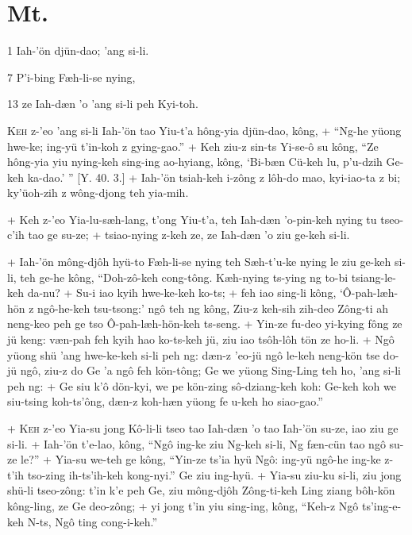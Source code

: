 \section{Mt.}%

\begin{sAbstract}
	\item[1] Iah-'ön djün-dao; 'ang si-li.
	\item[7] P'i-bing Fæh-li-se nying,
	\item[13] ze Iah-dæn 'o 'ang si-li peh Kyi-toh.
\end{sAbstract}

\header
\lettrine{K}{eh} z-'eo 'ang si-li Iah-'ön tao Yiu-t'a hông-yia djün-dao, kông,
+	``Ng-he yüong hwe-ke; ing-yü t'in-koh z gying-gao.''
+	Keh ziu-z sin-ts Yi-se-ô su kông, ``Ze hông-yia yiu nying-keh sing-ing ao-hyiang, kông, `Bi-bæn Cü-keh lu, p'u-dzih Ge-keh ka-dao.' '' [Y. 40. 3.]
+	Iah-'ön tsiah-keh i-zông z lôh-do mao, kyi-iao-ta z bi; ky'üoh-zih z wông-djong teh yia-mih.
\par
+	Keh z-'eo Yia-lu-sæh-lang, t'ong Yiu-t'a, teh Iah-dæn 'o-pin-keh nying tu tseo-c'ih tao ge su-ze;
+	tsiao-nying z-keh ze, ze Iah-dæn 'o ziu ge-keh si-li.
\par
+	Iah-'ön mông-djôh hyü-to Fæh-li-se nying teh Sæh-t'u-ke nying le ziu ge-keh si-li, teh ge-he kông, ``Doh-zô-keh cong-tông. Kæh-nying ts-ying ng to-bi tsiang-le-keh da-nu?
+	Su-i iao kyih hwe-ke-keh ko-ts;
+	feh iao sing-li kông, `Ô-pah-læh-hön z ngô-he-keh tsu-tsong:' ngô teh ng kông, Ziu-z keh-sih zih-deo Zông-ti ah neng-keo peh ge tso Ô-pah-læh-hön-keh ts-seng.
+	Yin-ze fu-deo yi-kying fông ze jü keng: væn-pah feh kyih hao ko-ts-keh jü, ziu iao tsôh-lôh tön ze ho-li.
+	Ngô yüong shü 'ang hwe-ke-keh si-li peh ng: dæn-z 'eo-jü ngô le-keh neng-kön tse do-jü ngô, ziu-z do Ge 'a ngô feh kön-tông; Ge we yüong Sing-Ling teh ho, 'ang si-li peh ng:
+	Ge siu k'ô dön-kyi, we pe kön-zing sô-dziang-keh koh: Ge-keh koh we siu-tsing koh-ts'ông, dæn-z koh-hæn yüong fe u-keh ho siao-gao.''
\par
+	\textsc{Keh} z-'eo Yia-su jong Kô-li-li tseo tao Iah-dæn 'o tao Iah-'ön su-ze, iao ziu ge si-li.
+	Iah-'ön t'e-lao, kông, ``Ngô ing-ke ziu Ng-keh si-li, Ng fæn-cün tao ngô su-ze le?''
+	Yia-su we-teh ge kông, ``Yin-ze ts'ia hyü Ngô: ing-yü ngô-he ing-ke z-t'ih tso-zing ih-ts'ih-keh kong-nyi.'' Ge ziu ing-hyü.
+	Yia-su ziu-ku si-li, ziu jong shü-li tseo-zông: t'in k'e peh Ge, ziu mông-djôh Zông-ti-keh Ling ziang bôh-kön kông-ling, ze Ge deo-zông;
+	yi jong t'in yiu sing-ing, kông, ``Keh-z Ngô ts'ing-e-keh N-ts, Ngô ting cong-i-keh.''



